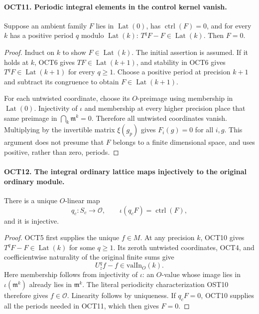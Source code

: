 \documentclass[11pt,a4paper]{article}
\numberwithin{equation}{section}
\theoremstyle{remark}\newtheorem{remark}[theorem]{Remark}
\begin{document}
\paragraph{OCT11. Periodic integral elements in the control kernel vanish.}
\label{claim:OCT11}
Suppose an ambient family $F$ lies in $\operatorname{Lat}(0)$,
has $\operatorname{ctrl}(F)=0$, and for every $k$ has a
positive period $q$ modulo $\operatorname{Lat}(k)$:
$T^qF-F\in\operatorname{Lat}(k)$.  Then $F=0$.
\begin{proof}
Induct on $k$ to show $F\in\operatorname{Lat}(k)$.  The
initial assertion is assumed.  If it holds at $k$, OCT6 gives
$TF\in\operatorname{Lat}(k+1)$, and stability in OCT6 gives
$T^qF\in\operatorname{Lat}(k+1)$ for every $q\geq1$.
Choose a positive period at precision $k+1$ and subtract its
congruence to obtain $F\in\operatorname{Lat}(k+1)$.

For each untwisted coordinate, choose its $O$-preimage using
membership in $\operatorname{Lat}(0)$.  Injectivity of
$\iota$ and membership at every higher precision place that
same preimage in $\bigcap_k\mathfrak m^k=0$.  Therefore all
untwisted coordinates vanish.  Multiplying by the invertible
matrix $\xi(g_p)$ gives $F_i(g)=0$ for all $i,\allowbreak{} g$.
This argument does not presume that $F$ belongs to a finite
dimensional space, and uses positive, rather than zero,
periods.
\end{proof}

\paragraph{OCT12. The integral ordinary lattice maps injectively to the original ordinary module.}
\label{claim:OCT12}
There is a unique $O$-linear map
\[
             q_c:S_c\longrightarrow\mathcal O,
                  \qquad \iota(q_cF)=\operatorname{ctrl}(F),
\]
and it is injective.
\begin{proof}
OCT5 first supplies the unique $f\in M$.  At any precision
$k$, OCT10 gives $T^qF-F\in\operatorname{Lat}(k)$ for some
$q\geq1$.  Its zeroth untwisted coordinates, OCT4, and
coefficientwise naturality of the original finite sums give
\[
                     U_z^q f-f\in\mathrm{valIn}_O(k).
\]
Here membership follows from injectivity of $\iota$:
an $O$-value whose image lies in $\iota(\mathfrak m^k)$
already lies in $\mathfrak m^k$.  The literal periodicity
characterization OST10 therefore gives $f\in\mathcal O$.
Linearity follows by uniqueness.  If $q_cF=0$, OCT10 supplies
all the periods needed in OCT11, which then gives $F=0$.
\end{proof}
\end{document}
